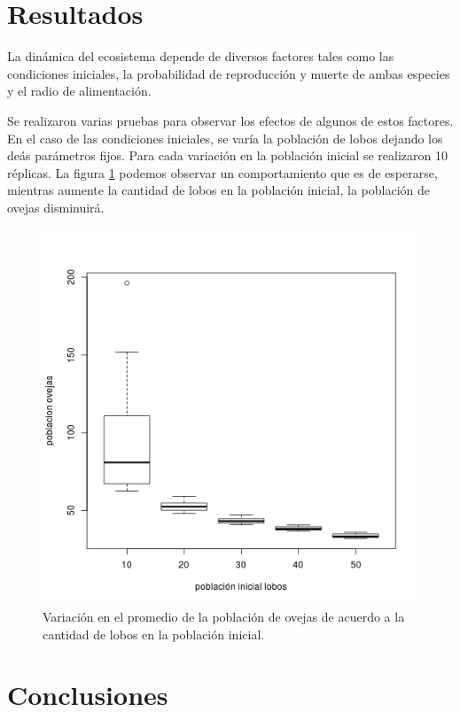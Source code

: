 \documentclass[12pt, twocolumn]{article}
\begin{document}
\section{Resultados}
\label{sec:resul}

La din\'amica del ecosistema depende de diversos factores tales como las condiciones iniciales, la probabilidad de reproducci\'on y muerte de ambas especies y el radio de alimentaci\'on.

Se realizaron varias pruebas para observar los efectos de algunos de estos factores. En el caso de las condiciones iniciales, se var\'ia la poblaci\'on de lobos dejando los de\'as par\'ametros fijos. Para cada variaci\'on en la poblaci\'on inicial se realizaron 10 r\'eplicas. La figura \ref{ovejas} podemos observar un comportamiento que es de esperarse, mientras aumente la cantidad de lobos en la poblaci\'on inicial, la poblaci\'on de ovejas disminuir\'a.

\begin{figure}
	\centering
	\includegraphics[scale=0.45]{ovejitas.png}
	\caption{Variaci\'on en el promedio de la poblaci\'on de ovejas de acuerdo a la cantidad de lobos en la poblaci\'on inicial.}
	\label{ovejas}
\end{figure}
 
\section{Conclusiones}
\label{sec:con}
\end{document}
